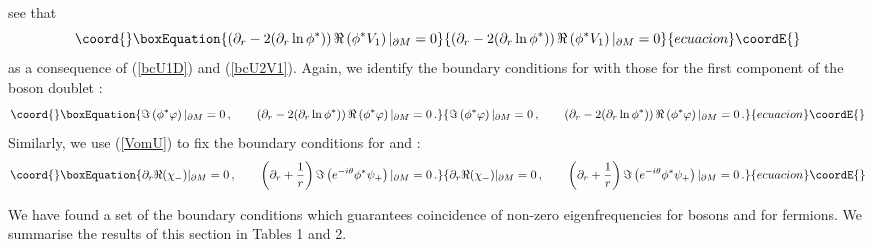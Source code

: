 \documentclass[a4paper,12pt]{article}
\begin{document}
see that
\begin{equation}\coord{}\boxEquation{
\left( \partial_r -2(\partial_r \ln \phi^* ) \right)\Re 
\left( \phi^* V_1 \right)|_{\partial M}=0  \label{bcV1N}
}{
\left( \partial_r -2(\partial_r \ln \phi^* ) \right)\Re 
\left( \phi^* V_1 \right)|_{\partial M}=0  }{ecuacion}\coordE{}\end{equation}
as a consequence of (\ref{bcU1D}) and (\ref{bcU2V1}). Again, we identify 
the boundary conditions for \coordHE{} with those for the first component
of the boson doublet \coordHE{}:
\begin{equation}\coord{}\boxEquation{
\Im \left( \phi^* \varphi \right)|_{\partial M}=0 \,,\qquad
\left( \partial_r -2(\partial_r \ln \phi^* ) \right)\Re 
\left( \phi^* \varphi \right)|_{\partial M}=0 \,.\label{bcphi}
}{
\Im \left( \phi^* \varphi \right)|_{\partial M}=0 \,,\qquad
\left( \partial_r -2(\partial_r \ln \phi^* ) \right)\Re 
\left( \phi^* \varphi \right)|_{\partial M}=0 \,.}{ecuacion}\coordE{}\end{equation}
Similarly, we use (\ref{VomU}) to fix the boundary conditions for
\coordHE{} and \coordHE{}:
\begin{equation}\coord{}\boxEquation{
\partial_r \Re (\chi_-)|_{\partial M}=0\,,\qquad
\left( \partial_r +\frac 1r \right) 
\Im \left( e^{-i\theta} \phi^* \psi_+ \right)|_{\partial M}=0\,.
\label{bcUUN}
}{
\partial_r \Re (\chi_-)|_{\partial M}=0\,,\qquad
\left( \partial_r +\frac 1r \right) 
\Im \left( e^{-i\theta} \phi^* \psi_+ \right)|_{\partial M}=0\,.
}{ecuacion}\coordE{}\end{equation}

We have found a set of the boundary conditions which guarantees 
coincidence of non-zero eigenfrequencies for bosons and for
fermions. 
We summarise the results of this section in Tables 1 and 2.
\end{document}
